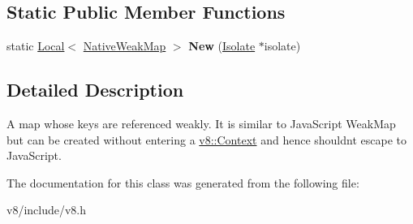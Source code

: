 \subsection*{Static Public Member Functions}
\begin{DoxyCompactItemize}
\item 
\hypertarget{classv8_1_1NativeWeakMap_afeb513d14fbb8d4537e4a051c71fbf31}{}static \hyperlink{classv8_1_1Local}{Local}$<$ \hyperlink{classv8_1_1NativeWeakMap}{Native\+Weak\+Map} $>$ {\bfseries New} (\hyperlink{classv8_1_1Isolate}{Isolate} $\ast$isolate)\label{classv8_1_1NativeWeakMap_afeb513d14fbb8d4537e4a051c71fbf31}

\end{DoxyCompactItemize}


\subsection{Detailed Description}
A map whose keys are referenced weakly. It is similar to Java\+Script Weak\+Map but can be created without entering a \hyperlink{classv8_1_1Context}{v8\+::\+Context} and hence shouldn\textquotesingle{}t escape to Java\+Script. 

The documentation for this class was generated from the following file\+:\begin{DoxyCompactItemize}
\item 
v8/include/v8.\+h\end{DoxyCompactItemize}
